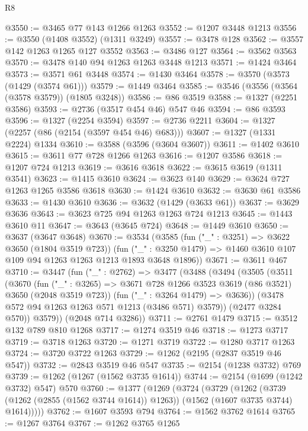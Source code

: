 \begin{lexlean}{R8}
\begin{coremodule}
@3550 := @3465 @77 @143 @1266 @1263
@3552 := @1207 @3448 @1213
@3556 := @3550 (@1408 @3552) (@1311 @3249)
@3557 := @3478 @128
@3562 := @3557 @142 @1263 @1265 @127 @3552
@3563 := @3486 @127
@3564 := @3562 @3563
@3570 := @3478 @140 @94 @1263 @1263 @3448 @1213
@3571 := @1424 @3464
@3573 := @3571 @61 @3448
@3574 := @1430 @3464
@3578 := @3570 (@3573 (@1429 (@3574 @61)))
@3579 := @1449 @3464
@3585 := @3546 (@3556 (@3564 (@3578 @3579)) (@1805 @3248))
@3586 := @86 @3519
@3588 := @1327 (@2251 @3586)
@3593 := @2736 (@3517 @454 @46) @547 @46
@3594 := @86 @3593
@3596 := @1327 (@2254 @3594)
@3597 := @2736 @2211
@3604 := @1327 (@2257 (@86 (@2154 (@3597 @454 @46) @683)))
@3607 := @1327 (@1331 @2224) @1334
@3610 := @3588 (@3596 (@3604 @3607))
@3611 := @1402 @3610
@3615 := @3611 @77 @728 @1266 @1263
@3616 := @1207 @3586
@3618 := @1207 @724 @1213
@3619 := @3616 @3618
@3622 := @3615 @3619 (@1311 @3541)
@3623 := @1415 @3610
@3624 := @3623 @140
@3629 := @3624 @727 @1263 @1265 @3586 @3618
@3630 := @1424 @3610
@3632 := @3630 @61 @3586
@3633 := @1430 @3610
@3636 := @3632 (@1429 (@3633 @61))
@3637 := @3629 @3636
@3643 := @3623 @725 @94 @1263 @1263 @724 @1213
@3645 := @1443 @3610 @11
@3647 := @3643 (@3645 @724)
@3648 := @1449 @3610
@3650 := @3637 (@3647 @3648)
@3670 := @3534
    (@3585
      (fun ("_" : @3251) => @3622 @3650 (@1804 @3519 @723))
      (fun ("_" : @3250 @1479) => @1460 @3610 @107 @109 @94 @1263 @1263 @1213 @1893 @3648 @1896))
@3671 := @3611 @467
@3710 := @3447
    (fun ("_" : @2762) =>
    @3477
      (@3488
        (@3494
          (@3505
            (@3511
              (@3670
                (fun ("_" : @3265) =>
                @3671 @728 @1266 @3523 @3619 (@86 @3521) @3650 (@2048 @3519 @723))
                (fun ("_" : @3264 @1479) => @3636))
              (@3478 @572 @94 @1263 @1263 @571 @1213 (@3486 @571) @3579))
            (@2477 @3284 @570))
          @3579))
      (@2048 @714 @3286))
@3711 := @2761 @1479
@3715 := @3512 @132 @789 @810 @1268
@3717 := @1274 @3519 @46
@3718 := @1273 @3717
@3719 := @3718 @1263
@3720 := @1271 @3719
@3722 := @1280 @3717 @1263
@3724 := @3720 @3722 @1263
@3729 := @1262 (@2195 (@2837 @3519 @46 @547))
@3732 := @2843 @3519 @46 @547
@3735 := @2154 (@1238 @3732) @769
@3739 := @1262 (@1267 (@1562 @3735 @1614))
@3744 := @2154 (@1699 (@1242 @3732) @547) @570
@3760 := @1377
    (@1269
      (@3724
        (@3729
          (@1262
            (@3739 (@1262 (@2855 (@1562 @3744 @1614)) @1263))
            (@1562 (@1607 @3735 @3744) @1614)))))
@3762 := @1607 @3593 @794
@3764 := @1562 @3762 @1614
@3765 := @1267 @3764
@3767 := @1262 @3765 @1265

\end{coremodule}
\end{lexlean}
